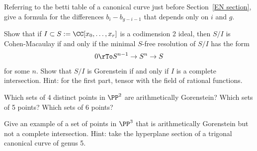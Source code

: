 \begin{exercise}
Referring to the betti table of a canonical curve just before Section~\ref{EN section}, give a formula
for the differences $b_i- b_{g-i-1}$ that depends only on $i$ and $g$.
\end{exercise}

\begin{exercise}
 Show that if $I \subset S := \CC[x_0,\dots, x_r]$ is a codimension 2 ideal, then $S/I$ is Cohen-Macaulay if and only
 if the minimal $S$-free resolution of $S/I$ has the form
 $$
 0\rTo S^{n-1} \to S^n \to S
 $$
 for some $n$. Show that $S/I$ is Gorenstein if and only if $I$ is a complete intersection. Hint: for the first part, tensor with
 the field of rational functions. 
\end{exercise}

\begin{exercise}
Which sets of 4 distinct points in $\PP^2$ are arithmetically Gorenstein? Which sets of 5 points? Which sets of 6 points?
\end{exercise}

\begin{exercise}
 Give an example of a set of points in $\PP^3$ that is arithmetically Gorenstein but not a complete intersection. Hint: take the 
hyperplane section of a trigonal canonical curve of genus 5.
\end{exercise}

